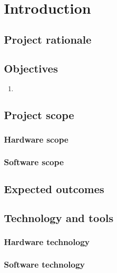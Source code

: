 \chapter{\ifenglish Introduction\else \fi}

\section{\ifenglish Project rationale\else \fi}

\section{\ifenglish Objectives\else \fi}
\begin{enumerate}
    \item
\end{enumerate}

\section{\ifenglish Project scope\else \fi}

\subsection{\ifenglish Hardware scope\else \fi}

\subsection{\ifenglish Software scope\else \fi}

\section{\ifenglish Expected outcomes\else \fi}

\section{\ifenglish Technology and tools\else \fi}

\subsection{\ifenglish Hardware technology\else \fi}

\subsection{\ifenglish Software technology\else \fi}

